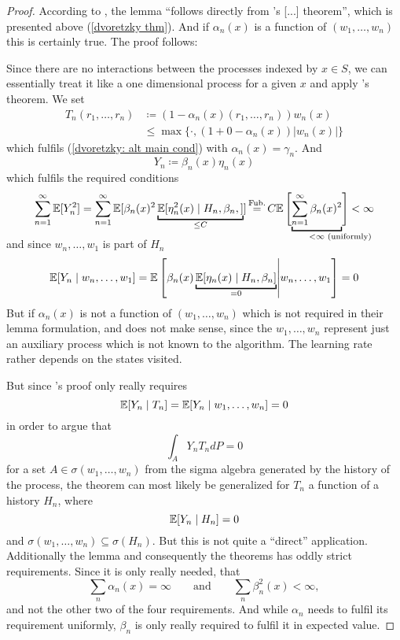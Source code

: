 \begin{proof}
    According to \citeauthor{jaakkolaConvergenceStochasticIterative1994a}, the lemma ``follows directly from \citeauthor{dvoretzkyStochasticApproximation1956}'s [...] theorem'', which is presented above (\ref{dvoretzky thm}). And if \(\alpha_n(x)\) is a function of \((w_1, \dots, w_n)\) this is certainly true. The proof follows:

    Since there are no interactions between the processes indexed by \(x\in S\), we can essentially treat it like a one dimensional process for a given \(x\) and apply \citeauthor{dvoretzkyStochasticApproximation1956}'s theorem. 
    We set
    \begin{align}
        T_n(r_1,\dots, r_n)
        &\coloneqq (1-\alpha_n(x)(r_1,\dots,r_n)) w_n(x) \\
        &\le \max\{\cdot, (1+ 0 -\alpha_n(x))|w_n(x)|\} \label{dvoretzky application}
    \end{align}
    which fulfils (\ref{dvoretzky: alt main cond}) with \(\alpha_n(x)=\gamma_n\). And
    \[
       Y_n\coloneqq \beta_n(x) \eta_n(x)
    \]
    which fulfils the required conditions
    \[
        \sum_{n=1}^\infty \E[Y_n^2] 
        = \sum_{n=1}^\infty \E[\beta_n(x)^2\underbracket[1pt]{\E[\eta_n^2(x)\mid H_n,\beta_n,]}_{\le C}]
        \xeq{\text{Fub.}} C \E\left[\vphantom{\sum_{n=1}^\infty}
            \smash{\underbracket[1pt]{
                \sum_{n=1}^\infty \beta_n(x)^2}_{
                <\infty \mathrlap{\text{ (uniformly)}}
                }}
        \right] <\infty
    \]
    and since \(w_n,\dots, w_1\) is part of \(H_n\) 
    \[
        \E[Y_n\mid w_n,\dots, w_1]=\E\left[\beta_n(x) \underbracket[1pt]{\E[\eta_n(x)\mid H_n, \beta_n]}_{\smash{=0}}   \middle| w_n,\dots, w_1\right]=0
    \]
    But if \(\alpha_n(x)\) is not a function of \((w_1,\dots,w_n)\) which is not required in their lemma formulation, and does not make sense, since the \(w_1,\dots,w_n\) represent just an auxiliary process which is not known to the algorithm. The learning rate rather depends on the states visited. 
    
    But since \citeauthor{dvoretzkyStochasticApproximation1956}'s proof only really requires
    \[
        \mathbb{E}[Y_n \mid T_n]=\mathbb{E}[Y_n \mid w_1,\dots,w_n]=0
    \]
    in order to argue that 
    \[
        \int_A Y_n T_n dP =0
    \]
    for a set \(A\in\sigma(w_1,\dots,w_n)\) from the sigma algebra generated by the history of the process, the theorem can most likely be generalized for \(T_n\) a function of a history \(H_n\), where
    \[
        \mathbb{E}[Y_n \mid H_n]=0
    \]
    and \(\sigma(w_1,\dots,w_n)\subseteq \sigma(H_n)\). But this is not quite a ``direct'' application. Additionally the lemma and consequently the theorems has oddly strict requirements. Since it is only really needed, that 
    \[
        \sum_n \alpha_n(x)=\infty \qquad \text{and} \qquad \sum_n \beta_n^2(x) < \infty,
    \]
    and not the other two of the four requirements. And while \(\alpha_n\) needs to fulfil its requirement uniformly, \(\beta_n\) is only really required to fulfil it in expected value. 
\end{proof}

